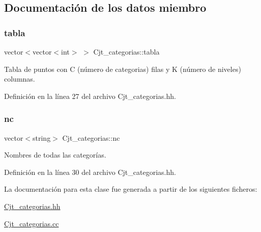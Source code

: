 \subsection{Documentación de los datos miembro}
\mbox{\label{class_cjt__categorias_af03722d79d2b1ec784954dd13a7168eb}} 
\subsubsection{\texorpdfstring{tabla}{tabla}}
{\footnotesize\ttfamily vector$<$vector$<$int$>$ $>$ Cjt\+\_\+categorias\+::tabla\hspace{0.3cm}{\ttfamily [private]}}



Tabla de puntos con C (número de categorias) filas y K (número de niveles) columnas. 



Definición en la línea 27 del archivo Cjt\+\_\+categorias.\+hh.

\mbox{\label{class_cjt__categorias_aad3febb4a17038ba65b2f79a4a509289}} 
\subsubsection{\texorpdfstring{nc}{nc}}
{\footnotesize\ttfamily vector$<$string$>$ Cjt\+\_\+categorias\+::nc\hspace{0.3cm}{\ttfamily [private]}}



Nombres de todas las categorías. 



Definición en la línea 30 del archivo Cjt\+\_\+categorias.\+hh.



La documentación para esta clase fue generada a partir de los siguientes ficheros\+:\begin{DoxyCompactItemize}
\item 
\hyperlink{_cjt__categorias_8hh}{Cjt\+\_\+categorias.\+hh}\item 
\hyperlink{_cjt__categorias_8cc}{Cjt\+\_\+categorias.\+cc}\end{DoxyCompactItemize}
